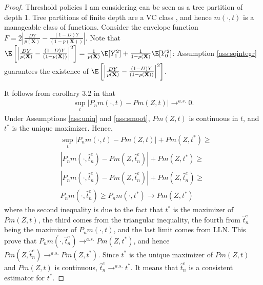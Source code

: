 {\begin{proof}
Threshold policies I am considering can be seen as a tree partition of depth 1. Tree partitions of finite depth are a VC class \citep{leboeuf2020decision}, and hence $m\left(\cdot, t\right)$ is a manageable class of functions. Consider the envelope function $F = 2\left|\frac{D Y}{p(\textbf{X})} - \frac{(1-D) Y}{(1-p(\textbf{X}))}\right|$. Note that $\E\left[\left|\frac{D Y}{p(\textbf{X})} - \frac{(1-D) Y}{(1-p(\textbf{X}))}\right|^2\right] = \frac{1}{p(\textbf{X})} \E[Y_1^2] + \frac{1}{1-p(\textbf{X})} \E[Y_0^2] $: Assumption \ref{ass:sqintegr} guarantees the existence of $\E\left[\left|\frac{D Y}{p(\textbf{X})} - \frac{(1-D) Y}{(1-p(\textbf{X}))}\right|^2\right]$.

It follows from corollary 3.2 in \cite{kim1990cube} that
\begin{gather}
    \sup _t\left|P_n m(\cdot, t)-P m(Z, t)\right| \rightarrow^{a.s.} 0 .
\end{gather}
Under Assumptions \ref{ass:uniq} and \ref{ass:smoot}, $P m(Z, t)$ is continuous in $t$, and $t^*$ is the unique maximizer. Hence,
\begin{align}
    & \sup _t\left|P_n m(\cdot, t)-P m(Z, t)\right| + P m(Z, t^*) \geq \\
   & \left|P_n m(\cdot, \hat{t}^e_n)-P m(Z, \hat{t}^e_n)\right| + P m(Z, t^*) \geq \\
   & \left|P_n m(\cdot, \hat{t}^e_n)-P m(Z, \hat{t}^e_n)\right| + P m(Z, \hat{t}^e_n) \geq \\
   & P_n m(\cdot, \hat{t}^e_n) \geq P_n m(\cdot, t^*) \rightarrow P m(Z, t^*)
\end{align}
where the second inequality is due to the fact that $t^*$ is the maximizer of $Pm(Z,t)$, the third comes from the triangular inequality, the fourth from $\hat{t}^e_n$ being the maximizer of $P_n m(\cdot, t)$, and the last limit comes from LLN. This prove that $ P_n m(\cdot, \hat{t}^e_n) \rightarrow^{a.s.} P m(Z, t^*) $, and hence $ P m(Z, \hat{t}^e_n) \rightarrow^{a.s.} P m(Z, t^*) $. Since $t^*$ is the unique maximizer of $P m(Z, t)$ and $P m(Z, t)$ is continuous, $\hat{t}^e_n \rightarrow^{a.s.} t^*$. It means that $\hat{t}^e_n$ is a consistent estimator for $t^*$.
\end{proof}

}
